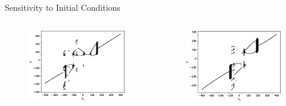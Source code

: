 \documentclass{beamer}
\begin{document}
\begin{frame}{Sensitivity to Initial Conditions}
	\begin{columns}
	\begin{column}{0.5\textwidth}
		\begin{figure}
			\centering
			\includegraphics[width=1.2\textwidth]{y4bifurcation.eps}
		\end{figure}
	\end{column}
	\begin{column}{0.5\textwidth}
		\begin{figure}
			\centering
			\includegraphics[width=1.2\textwidth]{y5bifurcation.eps}
		\end{figure}
	\end{column}
	\end{columns}
\end{frame}
\end{document}
